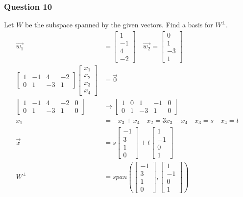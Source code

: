 \documentclass{math}
\begin{document}
\subsubsection*{Question 10}
Let \( W \) be the subspace spanned by the given vectors. Find a basis for
\( W^{\bot} \).
\begin{align*}
  \vec{w_1} &= \begin{bmatrix}1 \\ -1 \\ 4 \\ -2\end{bmatrix} \quad
    \vec{w_2} = \begin{bmatrix}0 \\ 1 \\ -3 \\ 1\end{bmatrix} \\
  \begin{bmatrix}
    1 & -1 & 4 & -2 \\
    0 & 1 & -3 & 1
  \end{bmatrix}\begin{bmatrix}x_1 \\ x_2 \\ x_3 \\ x_4\end{bmatrix} &=
    \vec{0} \\
  \left[\begin{array}{cccc|c}
    1 & -1 & 4 & -2 & 0 \\
    0 & 1 & -3 & 1 & 0
  \end{array}\right] &\to \left[\begin{array}{cccc|c}
    1 & 0 & 1 & -1 & 0 \\
    0 & 1 & -3 & 1 & 0
  \end{array}\right] \\
  x_1 &= -x_3+x_4 \quad x_2 = 3x_3-x_4 \quad x_3 = s \quad x_4 = t \\
  \vec{x} &= s\begin{bmatrix}-1 \\ 3 \\ 1 \\ 0\end{bmatrix}+
    t\begin{bmatrix}1 \\ -1 \\ 0 \\ 1\end{bmatrix} \\
  W^{\bot} &= span\left(
    \begin{bmatrix}-1 \\ 3 \\ 1 \\ 0\end{bmatrix},
    \begin{bmatrix}1 \\ -1 \\ 0 \\ 1\end{bmatrix}
  \right)
\end{align*}
\end{document}
